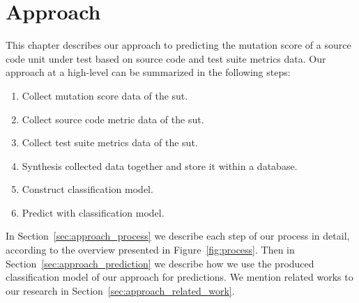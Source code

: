 \chapter{Approach}
\label{chap:approach}
This chapter describes our approach to predicting the mutation score of a source code unit under test based on source code and test suite metrics data. Our approach at a high-level can be summarized in the following steps:

\begin{enumerate}
	\item Collect mutation score data of the \gls{sut}.
	\item Collect source code metric data of the \gls{sut}.
	\item Collect test suite metrics data of the \gls{sut}.
	\item Synthesis collected data together and store it within a database.
	\item Construct classification model.
	\item Predict with classification model.
\end{enumerate}

In Section~\ref{sec:approach_process} we describe each step of our process in detail, according to the overview presented in Figure~\ref{fig:process}. Then in Section~\ref{sec:approach_prediction} we describe how we use the produced classification model of our approach for predictions. We mention related works to our research in Section~\ref{sec:approach_related_work}.


